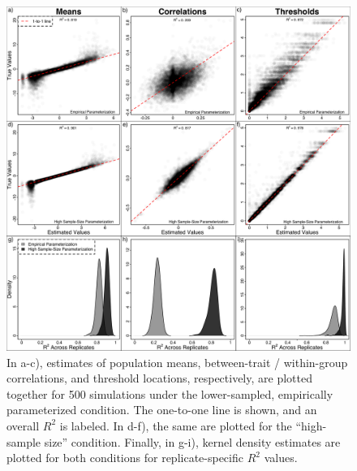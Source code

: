 \begin{figure}[h]
\centering
\includegraphics[width=160mm]{figures/chpt4_figure6.pdf}
\caption[Optimization Output for TSAR-MBOP Simulation Study]{In a-c), estimates of population means, between-trait / within-group correlations, and threshold locations, respectively, are plotted together for 500 simulations under the lower-sampled, empirically parameterized condition. The one-to-one line is shown, and an overall $R^2$ is labeled. In d-f), the same are plotted for the ``high-sample size'' condition. Finally, in g-i), kernel density estimates are plotted for both conditions for replicate-specific $R^2$ values.  \label{overflow}
\label{fig:simsOptimResults}
}
\end{figure}


